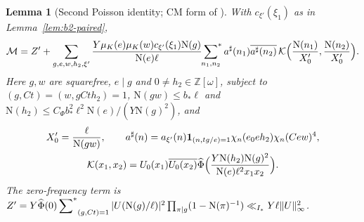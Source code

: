 \documentclass[11pt]{article}
\numberwithin{equation}{section}
\newcommand{\OO}{\mathbb Z[\omega]}
\newcommand{\N}{\mathrm N}
\newcommand{\muk}{\mu_K}
\newcommand{\ind}{\mathbf1}
\newcommand{\ssum}{\sideset{}{^*}\sum}
\newtheorem{lemma}{Lemma}
\begin{document}
\begin{lemma}[Second Poisson identity; CM form of {\cite[Lemma~7.2]{OAI1112}}]\label{lem:b4-second-id}
With $c_{\xi'}(\xi_1)$ as in Lemma~\ref{lem:b2-paired},
\begin{equation}\label{eq:d066}
 \mathcal M=Z'+\sum_{g,e,w,h_2,\xi'}\frac{Y\muk(e)\muk(w)c_{\xi'}(\xi_1)\N(g)}{\N(e)\ell}
 \ssum_{n_1,n_2}a^\sharp(n_1)\overline{a^\sharp(n_2)}\,
 \mathcal K\Bigl(\frac{\N(n_1)}{X_0'},\frac{\N(n_2)}{X_0'}\Bigr).
\end{equation}
Here $g,w$ are squarefree, $e\mid g$ and $0\ne h_2\in\OO$, subject to $(g,Ct)=(w,gCth_2)=1$,
$\N(gw)\le b_*\ell$ and $\N(h_2)\le C_\Phi b_*^2\ell^2\N(e)/(Y\N(g)^2)$, and
\begin{equation}\label{eq:d201}\begin{gathered}
 X_0'=\frac\ell{\N(gw)},\qquad
 a^\sharp(n)=a_{\xi'}(n)\ind_{(n,tg/e)=1}\chi_n(e_0eh_2)\chi_n(Cew)^4,\\
 \mathcal K(x_1,x_2)=U_0(x_1)\overline{U_0(x_2)}
 \widehat\Phi\Bigl(\frac{Y\N(h_2)\N(g)^2}{\N(e)\ell^2x_1x_2}\Bigr).
\end{gathered}\end{equation}
The zero-frequency term is
$Z'=Y\widehat\Phi(0)\ssum_{(g,Ct)=1}|U(\N(g)/\ell)|^2\prod_{\pi\mid g}(1-\N(\pi)^{-1})\ll_{I_*}Y\ell\|U\|_\infty^2$.
\end{lemma}
\end{document}
